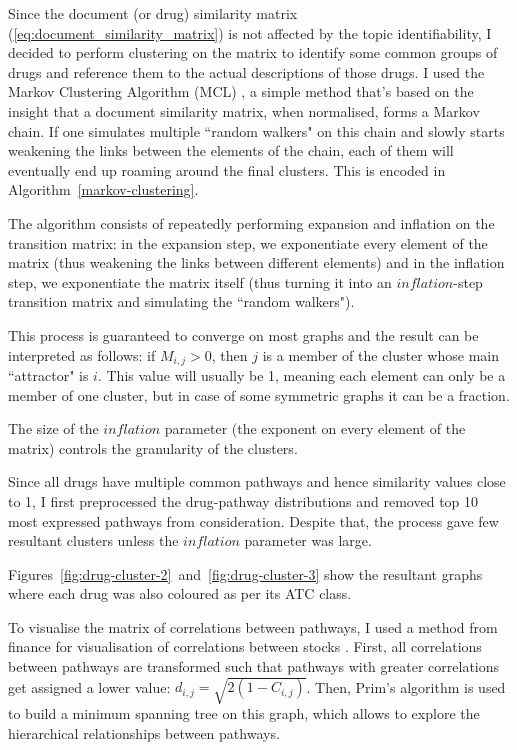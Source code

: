 \documentclass[12pt,a4paper,twoside,openright]{report}
\begin{document}
Since the document (or drug) similarity matrix (\ref{eq:document_similarity_matrix}) is not affected by the topic identifiability, I decided to perform clustering on the matrix to identify some common groups of drugs and reference them to the actual descriptions of those drugs.
I used the Markov Clustering Algorithm (MCL)  \cite{Dongen:2000:CAG:868986}, a simple method that's based on the insight that a document similarity matrix, when normalised, forms a Markov chain. If one simulates multiple ``random walkers" on this chain and slowly starts weakening the links between the elements of the chain, each of them will eventually end up roaming around the final clusters. This is encoded in Algorithm~\ref{markov-clustering}.



The algorithm consists of repeatedly performing expansion and inflation on the transition matrix: in the expansion step, we exponentiate every element of the matrix (thus weakening the links between different elements) and in the inflation step, we exponentiate the matrix itself (thus turning it into an $\mathit{inflation}$-step transition matrix and simulating the ``random walkers").

This process is guaranteed to converge on most graphs and the result can be interpreted as follows: if $M_{i,j} > 0$, then $j$ is a member of the cluster whose main ``attractor" is $i$. This value will usually be 1, meaning each element can only be a member of one cluster, but in case of some symmetric graphs it can be a fraction.

The size of the $\mathit{inflation}$ parameter (the exponent on every element of the matrix) controls the granularity of the clusters.

Since all drugs have multiple common pathways and hence similarity values close to 1, I first preprocessed the drug-pathway distributions and removed top 10 most expressed pathways from consideration. Despite that, the process gave few resultant clusters unless the $\mathit{inflation}$ parameter was large.

Figures~\ref{fig:drug-cluster-2}~and~\ref{fig:drug-cluster-3} show the resultant graphs where each drug was also coloured as per its ATC class.

To visualise the matrix of correlations between pathways, I used a method from finance for visualisation of correlations between stocks \cite{doi:10.1007/s100510050929}. First, all correlations between pathways are transformed such that pathways with greater correlations get assigned a lower value: $d_{i,j} = \sqrt{2(1 - C_{i, j})}$. Then, Prim's algorithm \cite{doi:10.1007/BF01386390} is used to build a minimum spanning tree on this graph, which allows to explore the hierarchical relationships between pathways.
\end{document}
